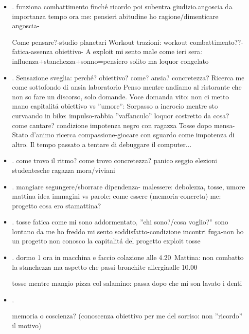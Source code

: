\begin{itemize}
\item {}.
funziona combattimento finch\'e ricordo poi subentra giudizio.angoscia da importanza tempo ora me: pensieri abitudine ho ragione/dimenticare angoscia-

Come pensare?-studio planetari
Workout trazioni: workout combattimento??-fatica-assenza obiettivo-
A exploit mi sento male come ieri sera: influenza+stanchezza+sonno=pensiero solito ma loquor congelato

\item {}.
Sensazione sveglia: perch\'e? obiettivo? come? ansia? concretezza?
Ricerca me come sottofondo di ansia laboratorio
Penso mentre andiamo al ristorante che non so fare un discorso, solo domande.
Voce domanda vito: non ci metto mano
capitalit\'a obiettivo vs ''umore'': 
Sorpasso a incrocio mentre sto curvaando in bike: impulso-rabbia ''vaffanculo'' loquor costretto da cosa? come cantare?
condizione impotenza negro con ragazza
Tosse dopo mensa-Stato d'animo ricerca compassione-giocare con sguardo come impotenza di altro.
Il tempo passato a tentare di debuggare il computer...
\item {}.
come trovo il ritmo? come trovo concretezza? 
panico seggio elezioni studentesche
ragazza mora/viviani
\item {}.
mangiare segungere/sborrare dipendenza-
malessere: debolezza, tosse, umore mattina
idea immagini vs parole: come essere (memoria-concreta) me: progetto
cosa ero stamattina? 
\item {}.
tosse fatica come mi sono addormentato, ''chi sono?/cosa voglio?''
sono lontano da me
ho freddo
mi sento soddisfatto-condizione incontri fuga-non ho un progetto non conosco la capitalit\'a del progetto
exploit tosse
\item {}.
dormo 1 ora in macchina e faccio colazione alle 4.20\
Mattina: non combatto la stanchezza ma aspetto che passi-bronchite allergiaalle 10.00

tosse mentre mangio pizza col salamino: passa dopo che mi son lavato i denti
\item \DTMsavedate{lun}{2018-05-14}\DTMusedate{lun}.

memoria o coscienza?
(conoscenza obiettivo per me del sorriso: non ''ricordo'' il motivo)


\end{itemize}
